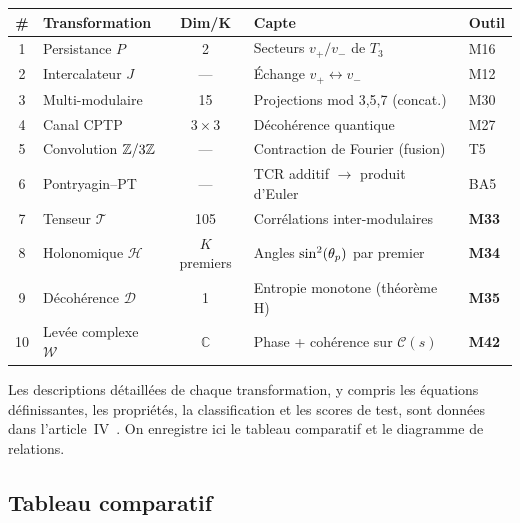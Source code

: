 \documentclass[12pt,a4paper]{article}
\begin{document}
\begin{center}
\small
\begin{tabular}{clcll}
\toprule
\textbf{\#} & \textbf{Transformation} & \textbf{Dim/K} &
  \textbf{Capte} & \textbf{Outil} \\
\midrule
1 & Persistance $P$ & 2 &
  Secteurs $v_+/v_-$ de $T_3$ & M16 \\
2 & Intercalateur $J$ & --- &
  Échange $v_+ \leftrightarrow v_-$ & M12 \\
3 & Multi-modulaire & 15 &
  Projections mod 3,5,7 (concat.) & M30 \\
4 & Canal CPTP & $3\times 3$ &
  Décohérence quantique & M27 \\
5 & Convolution $\mathbb{Z}/3\mathbb{Z}$ & --- &
  Contraction de Fourier (fusion) & T5 \\
6 & Pontryagin--PT & --- &
  TCR additif $\to$ produit d'Euler & BA5 \\
7 & Tenseur $\mathcal{T}$ & 105 &
  Corrélations inter-modulaires & \textbf{M33} \\
8 & Holonomique $\mathcal{H}$ & $K$ premiers &
  Angles $\sin^2(\theta_{p})$ par premier & \textbf{M34} \\
9 & Décohérence $\mathcal{D}$ & 1 &
  Entropie monotone (théorème H) & \textbf{M35} \\
10 & Levée complexe $\mathcal{W}$ & $\mathbb{C}$ &
  Phase + cohérence sur $\mathcal{C}(s)$ & \textbf{M42} \\
\bottomrule
\end{tabular}
\end{center}

Les descriptions détaillées de chaque transformation, y compris
les équations définissantes, les propriétés, la classification et
les scores de test, sont données dans l'article~IV~\cite{companion_M4}.
On enregistre ici le tableau comparatif et le diagramme de
relations.

\subsection*{Tableau comparatif}
\end{document}
